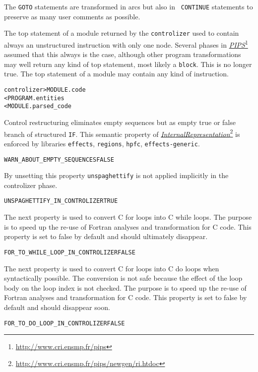 \documentclass[a4paper]{report}
\newenvironment{PipsProp}{\begin{alltt}}{\end{alltt}}
\newenvironment{PipsMake}{\begin{alltt}}{\end{alltt}}
\newcommand{\LINK}[2]{\href{#2}{#1}\footnote{\url{#2}}\xspace}
\newcommand{\PIPS}{\LINK{\emph{PIPS}}{http://www.cri.ensmp.fr/pips}}
\newcommand{\Pri}{\LINK{\emph{Internal\space{}Representation}}{http://www.cri.ensmp.fr/pips/newgen/ri.htdoc}}
\begin{document}
The {\tt GOTO} statements are transformed in arcs but also in {\tt
CONTINUE} statements to preserve as many user comments as possible.

The top statement of a module returned by the \texttt{controlizer} used to
contain always an unstructured instruction with only one node. Several phases
in \PIPS{} assumed that this always is the case, although other program
transformations may well return any kind of top statement, most likely a
\texttt{block}. This is no longer true. The top statement of a module may
contain any kind of instruction.

\begin{PipsMake}
controlizer                     > MODULE.code
        < PROGRAM.entities
        < MODULE.parsed_code
\end{PipsMake}

Control restructuring eliminates empty sequences but as empty true or
false branch of structured \verb/IF/. This semantic property of \Pri{}
is enforced by libraries \verb/effects/,
\verb/regions/, \verb/hpfc/, \verb/effects-generic/.

\begin{PipsProp}
WARN_ABOUT_EMPTY_SEQUENCES FALSE
\end{PipsProp}


By unsetting this property \verb|unspaghettify| is not applied
implicitly in the controlizer phase.

\begin{PipsProp}
UNSPAGHETTIFY_IN_CONTROLIZER   TRUE
\end{PipsProp}

The next property is used to convert C for loops into C while loops. The
purpose is to speed up the re-use of Fortran analyses and transformation
for C code. This property is set to false by default and should ultimately disappear.

\begin{PipsProp}
FOR_TO_WHILE_LOOP_IN_CONTROLIZER   FALSE
\end{PipsProp}

The next property is used to convert C for loops into C do loops when
syntactically possible. The conversion is not safe because the effect of
the loop body on the loop index is not checked. The purpose is to speed up
the re-use of Fortran analyses and transformation for C code. This
property is set to false by default and should disappear soon.

\begin{PipsProp}
FOR_TO_DO_LOOP_IN_CONTROLIZER   FALSE
\end{PipsProp}
\end{document}
